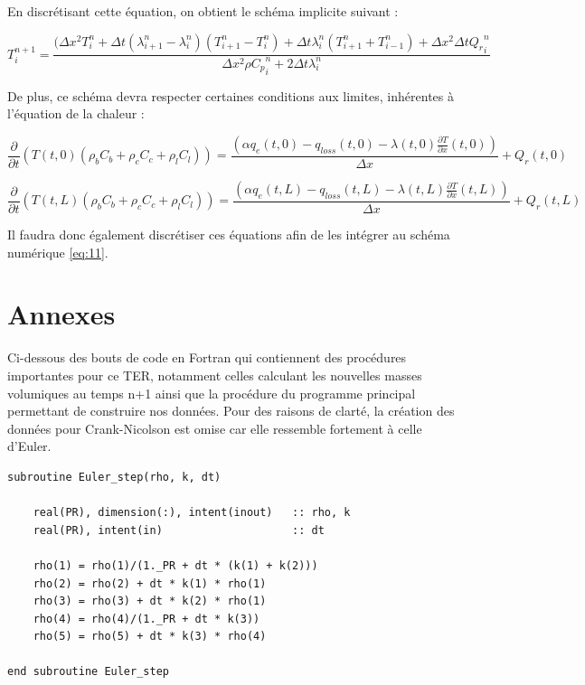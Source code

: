 \documentclass[a4paper,11pt]{article}
\begin{document}
En discrétisant cette équation, on obtient le schéma implicite suivant :

\begin{equation}\label{eq:11}
	   T_i^{n+1} = \frac {(\Delta x^2 T_i^n + \Delta t (\lambda_{i+1}^n - \lambda_i^n)(T_{i+1}^n - T_i^n) + \Delta t \lambda_i^n (T_{i+1}^n + T_{i-1}^n) + \Delta x^2 \Delta t {Q_r}_i^n} {\Delta x^2 \rho {C_p}_i^n + 2\Delta t \lambda_i^n}
\end{equation}

De plus, ce schéma devra respecter certaines conditions aux limites, inhérentes à l'équation de la chaleur :

\begin{equation}\label{eq:12}
       \frac \partial {\partial t} (T(t, 0)(\rho _b C_b + \rho _c C_c + \rho _l C_l)) = \frac {(\alpha q_e (t, 0) - q_{loss} (t, 0) - \lambda (t, 0)\frac {\partial T} {\partial x} (t, 0))} {\Delta x} + Q_r(t, 0)
\end{equation}

\begin{equation}\label{eq:13}
       \frac \partial {\partial t} (T(t, L)(\rho _b C_b + \rho _c C_c + \rho _l C_l)) = \frac {(\alpha q_e (t, L) - q_{loss} (t, L) - \lambda (t, L)\frac {\partial T} {\partial x} (t, L))} {\Delta x} + Q_r(t, L)
\end{equation}

Il faudra donc également discrétiser ces équations afin de les intégrer au schéma numérique \eqref{eq:11}.
\newpage
\section{Annexes}
Ci-dessous des bouts de code en Fortran qui contiennent des procédures importantes pour ce TER, notamment celles calculant les nouvelles masses volumiques au temps n+1 ainsi que la procédure du programme principal permettant de construire nos données. Pour des raisons de clarté, la création des données pour Crank-Nicolson est omise car elle ressemble fortement à celle d'Euler.

\vspace{0.5cm}
\begin{lstlisting}[caption={Procédure \texttt{Euler\_step}}, label={lst:euler_step}]
subroutine Euler_step(rho, k, dt)

    real(PR), dimension(:), intent(inout)   :: rho, k
    real(PR), intent(in)                    :: dt

    rho(1) = rho(1)/(1._PR + dt * (k(1) + k(2)))
    rho(2) = rho(2) + dt * k(1) * rho(1)
    rho(3) = rho(3) + dt * k(2) * rho(1)
    rho(4) = rho(4)/(1._PR + dt * k(3))
    rho(5) = rho(5) + dt * k(3) * rho(4)

end subroutine Euler_step
\end{lstlisting}
\end{document}
